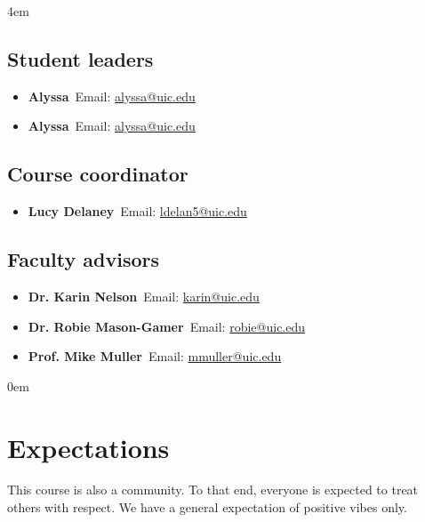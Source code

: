 \documentclass[]{article}
\begin{document}
\leftskip 4em
\begin{multicols}{2}
  

  \subsection{Student leaders}

  \begin{itemize}[label=$\mathwitch*$]
    \item{\textbf{Alyssa}\ Email: \url{alyssa@uic.edu}}
   \item{\textbf{Alyssa}\ Email: \url{alyssa@uic.edu}}
    \end{itemize}

    \columnbreak

\subsection{Course coordinator}
    
    \begin{itemize}[label=$\mathwitch*$]
    \item{\textbf{Lucy Delaney}\ Email: \url{ldelan5@uic.edu}}
    \end{itemize}

  \end{multicols}   


    \subsection{Faculty advisors}
    
    \begin{itemize}[label=$\mathwitch*$]
    \item{\textbf{Dr. Karin Nelson}\ Email: \url{karin@uic.edu}}
    \item{\textbf{Dr. Robie Mason-Gamer}\ Email: \url{robie@uic.edu}}
    \item{\textbf{Prof. Mike Muller}\  Email: \url{mmuller@uic.edu}}
    \end{itemize}
  

\leftskip 0em

\section{Expectations}

This course is also a community. To that end, everyone is expected to treat others with respect. We have a general expectation of positive vibes only.
\end{document}
